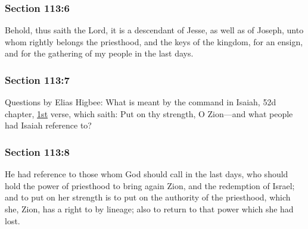	\subsubsection{Section 113:6} %
		\label{DC113-6}

		Behold, thus saith the Lord, it is a descendant of Jesse, as well as of Joseph, unto whom rightly belongs the priesthood, and the keys of the kingdom, for an ensign, and for the gathering of my people in the last days.


	\subsubsection{Section 113:7} %
		\label{DC113-7}

		Questions by Elias Higbee: What is meant by the command in Isaiah, 52d chapter, \hyperref[ISAIAH-52-1]{1st} verse, which saith: Put on thy strength, O Zion---and what people had Isaiah reference to?


	\subsubsection{Section 113:8} %
		\label{DC113-8}

		He had reference to those whom God should call in the last days, who should hold the power of priesthood to bring again Zion, and the redemption of Israel; and to put on her strength is to put on the authority of the priesthood, which she, Zion, has a right to by lineage; also to return to that power which she had lost.

